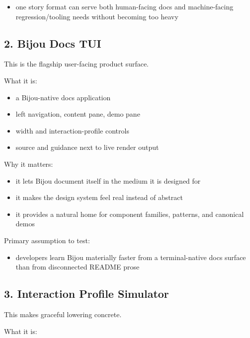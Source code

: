\begin{itemize}
\tightlist
\item
  one story format can serve both human-facing docs and machine-facing regression/tooling needs without becoming too heavy
\end{itemize}

\subsection{2. Bijou Docs TUI}\label{record-042-bijou-docs-tui}

This is the flagship user-facing product surface.

What it is:

\begin{itemize}
\tightlist
\item
  a Bijou-native docs application
\item
  left navigation, content pane, demo pane
\item
  width and interaction-profile controls
\item
  source and guidance next to live render output
\end{itemize}

Why it matters:

\begin{itemize}
\tightlist
\item
  it lets Bijou document itself in the medium it is designed for
\item
  it makes the design system feel real instead of abstract
\item
  it provides a natural home for component families, patterns, and canonical demos
\end{itemize}

Primary assumption to test:

\begin{itemize}
\tightlist
\item
  developers learn Bijou materially faster from a terminal-native docs surface than from disconnected README prose
\end{itemize}

\subsection{3. Interaction Profile Simulator}\label{record-042-interaction-profile-simulator}

This makes graceful lowering concrete.

What it is:

